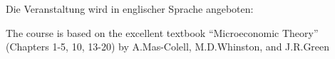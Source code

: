 \begin{course}
\begin{content}
\end{content}



\begin{literature}Die Veranstaltung wird in englischer Sprache angeboten:

 

The course is based on the excellent textbook “Microeconomic Theory” (Chapters 1-5, 10, 13-20) by A.Mas-Colell, M.D.Whinston, and J.R.Green

\end{literature}



\end{course}